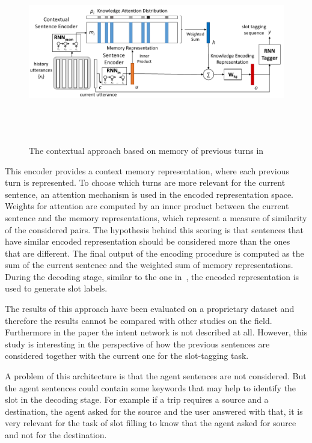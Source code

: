 
\begin{figure}[!htbp]
    \centering
    \includegraphics[max width=\linewidth,max height=8cm,keepaspectratio]{figures/contextualSLUchen}
    \caption{The contextual approach based on memory of previous turns in~\cite{chen2016end}}\label{fig:contextualSLUchen}
\end{figure}

This encoder provides a context memory representation, where each previous turn is represented. To choose which turns are more relevant for the current sentence, an attention mechanism is used in the encoded representation space. Weights for attention are computed by an inner product between the current sentence and the memory representations, which represent a measure of similarity of the considered pairs. The hypothesis behind this scoring is that sentences that have similar encoded representation should be considered more than the ones that are different. The final output of the encoding procedure is computed as the sum of the current sentence and the weighted sum of memory representations. During the decoding stage, similar to the one in~\cite{cho2014learning}, the encoded representation is used to generate slot labels.

The results of this approach have been evaluated on a proprietary dataset and therefore the results cannot be compared with other studies on the field. Furthermore in the paper the intent network is not described at all. However, this study is interesting in the perspective of how the previous sentences are considered together with the current one for the slot-tagging task.

A problem of this architecture is that the agent sentences are not considered. But the agent sentences could contain some keywords that may help to identify the slot in the decoding stage. For example if a trip requires a source and a destination, the agent asked for the source and the user answered with that, it is very relevant for the task of slot filling to know that the agent asked for source and not for the destination.

